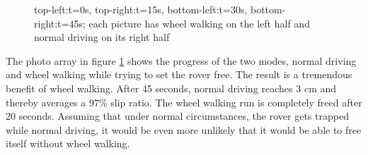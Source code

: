 \documentclass[a4paper,twocolumn]{esapub2005} %
\begin{document}
\begin{figure}[h!]
	\centering	
	\caption{top-left:t=0s,  top-right:t=15s, bottom-left:t=30s, bottom-right:t=45s; each picture has wheel walking on the left half and normal driving on its right half }
	\label{fig:volleysequence}
\end{figure}

The photo array in figure \ref{fig:volleysequence} shows the progress of the two modes, normal driving and wheel walking while trying to set the rover free. The result is a tremendous benefit of wheel walking. After 45 seconds, normal driving reaches 3 cm and thereby averages a 97\% slip ratio. The wheel walking run is completely freed after 20 seconds. Assuming that under normal circumstances, the rover gets trapped while normal driving, it would be even more unlikely that it would be able to free itself without wheel walking.
\end{document}
